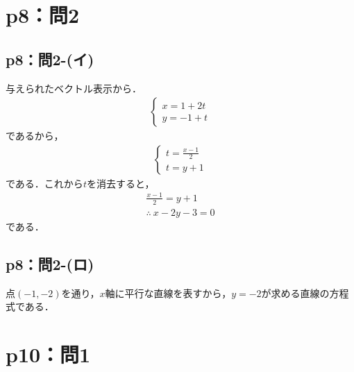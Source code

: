\documentclass[a4paper,10pt,fleqn]{ltjsarticle}
\begin{document}
\section*{p8：問2}


\subsection*{p8：問2-(イ)}

\begin{tleftbar}
  与えられたベクトル表示から．
  \begin{align*}
    \begin{cases}
      x=1+2t \\
      y=-1+t
    \end{cases}
  \end{align*}
  であるから，
  \begin{align*}
    \begin{cases}
      t=\frac{x-1}{2} \\
      t=y+1
    \end{cases}
  \end{align*}
  である．これから$t$を消去すると，
  \begin{gather*}
    \frac{x-1}{2} = y+1 \\
    \therefore ~ x-2y-3 =0
  \end{gather*}
  である．
\end{tleftbar}


\subsection*{p8：問2-(ロ)}

\begin{tleftbar}
  点$(-1,-2)$を通り，$x$軸に平行な直線を表すから，$y=-2$が求める直線の方程式である．
\end{tleftbar}
%
\newpage
%
%

\section*{p10：問1}
\end{document}
